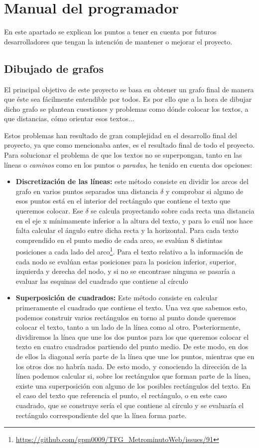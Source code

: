 \section{Manual del programador}
En este apartado se explican los puntos a tener en cuenta por futuros desarrolladores que tengan la intención de mantener o mejorar el proyecto.
\subsection{Dibujado de grafos}
El principal objetivo de este proyecto se basa en obtener un grafo final de manera que éste sea fácilmente entendible por todos. Es por ello que a la hora de dibujar dicho grafo se plantean cuestiones y problemas como dónde colocar los textos, a que distancias, cómo orientar esos textos$\dots$

Estos problemas han resultado de gran complejidad en el desarrollo final del proyecto, ya que como mencionaba antes, es el resultado final de todo el proyecto. Para solucionar el problema de que los textos no se superpongan, tanto en las líneas o \textit{caminos} como en los puntos o \textit{paradas}, he tenido en cuenta dos opciones:
\begin{itemize}
	\item \textbf{Discretización de las líneas:} este método consiste en dividir los arcos del grafo en varios puntos separados una distancia $\delta$ y comprobar si alguno de esos puntos está en el interior del rectángulo que contiene el texto que queremos colocar. Ese $\delta$ se calcula proyectando sobre cada recta una distancia en el eje x mínimamente inferior a la altura del texto, y para lo cuál nos hace falta calcular el ángulo entre dicha recta y la horizontal. Para cada texto comprendido en el punto medio de cada arco, se evalúan 8 distintas posiciones a cada lado del arco\footnote{\url{https://github.com/gpm0009/TFG_MetrominutoWeb/issues/91}}. Para el texto relativo a la información de cada nodo se evalúan estas posiciones para la posicion inferior, superior, izquierda y derecha del nodo, y si no se encontrase ninguna se pasaría a evaluar las esquinas del cuadrado que contiene al círculo
	
	\item \textbf{Superposición de cuadrados:} Este método consiste en calcular primeramente el cuadrado que contiene el texto. Una vez que sabemos esto, podemos construir varios rectángulos en torno al punto donde queremos colocar el texto, tanto a un lado de la línea como al otro. Posteriormente, dividiremos la línea que une los dos puntos para los que queremos colocar el texto en cuatro cuadrados partiendo del punto medio. De este modo, en dos de ellos la diagonal sería parte de la línea que une los puntos, mientras que en los otros dos no habría nada. De esto modo, y conociendo la dirección de la línea podemos calcular si, sobre los rectángulos que forman parte de la línea, existe una superposición con alguno de los posibles rectángulos del texto. En el caso del texto que referencia el punto, el rectángulo, o en este caso cuadrado, que se construye sería el que contiene al círculo y se evaluaría el rectángulo correspondiente del que la línea forma parte.
\end{itemize}

